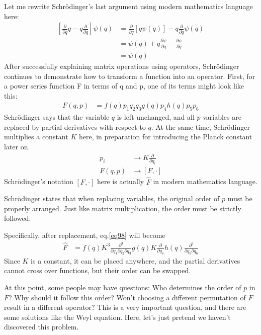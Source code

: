 \documentclass[a4paper, 12pt, oneside, onecolumn]{article}
\begin{document}
\begin{multicols}{2}
Let me rewrite Schrödinger's last argument using modern mathematics language here:
\begin{align}
	\left[ \frac{\partial}{\partial q} q - q \frac{\partial}{\partial q} \right] \psi \left( q \right)
	&= \frac{\partial}{\partial q} \left[ q \psi \left( q \right) \right] - q \frac{\partial}{\partial q} \psi \left( q \right) \nonumber \\
	&= \psi \left( q \right) + q \frac{\partial \psi}{\partial q} - \frac{\partial \psi}{\partial q} \nonumber \\
	&= \psi \left( q \right)
\end{align}
After successfully explaining matrix operations using operators, Schrödinger continues to demonstrate how to transform a function into an operator. First, for a power series function F in terms of q and p, one of its terms might look like this:
\begin{align}
	F \left( q, p\right)
	&= f \left( q \right) p_1 q_2 q_3 g \left( q \right) p_4 h \left( q \right) p_5 p_6 \label{eq98}
\end{align}
Schrödinger says that the variable $q$ is left unchanged, and all $p$ variables are replaced by partial derivatives with respect to $q$. At the same time, Schrödinger multiplies a constant $K$ here, in preparation for introducing the Planck constant later on.
\begin{align}
	p_i
	&\rightarrow K \frac{\partial}{\partial q_i} \\
	F \left( q, p\right)
	&\rightarrow \left[F, \cdot \right]
\end{align}
Schrödinger's notation $\left[F, \cdot \right]$ here is actually $\hat F$ in modern mathematics language.

Schrödinger states that when replacing variables, the original order of $p$ must be properly arranged. Just like matrix multiplication, the order must be strictly followed.

Specifically, after replacement, eq.\ref{eq98} will become
\begin{align}
	\hat F
	&= f \left( q \right) K^3 \frac{\partial^3}{\partial q_1 \partial q_2 \partial q_3} g \left( q \right) K \frac{\partial}{\partial q_4} h\left( q \right) \frac{\partial^2}{\partial q_5 \partial q_6}
\end{align}
Since $K$ is a constant, it can be placed anywhere, and the partial derivatives cannot cross over functions, but their order can be swapped.

At this point, some people may have questions: Who determines the order of $p$ in $F$? Why should it follow this order? Won't choosing a different permutation of $F$ result in a different operator? This is a very important question, and there are some solutions like the Weyl equation. Here, let's just pretend we haven't discovered this problem.


\end{multicols}
\end{document}
